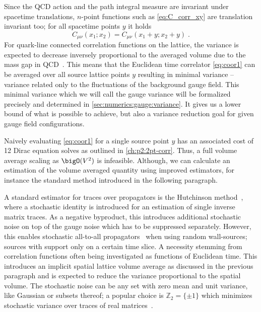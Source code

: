 Since the QCD action and the path integral measure are invariant under spacetime translations, $n$-point functions such as \cref{eq:C_corr_xy} are translation invariant too; for all spacetime points $y$ it holds
\begin{equation} \label{eq:translation:average}
C_{\mu \nu}(x_1; x_2) = C_{\mu \nu}(x_1 + y; x_2 + y) \;.
\end{equation}
For quark-line connected correlation functions on the lattice, the variance is expected to decrease inversely proportional to the averaged volume due to the mass gap in QCD~\cite{Luscher:2017cjh}.
This means that the Euclidean time correlator \cref{eq:coor1} can be averaged over all source lattice points $y$ resulting in minimal variance -- variance related only to the fluctuations of the background gauge field.
This minimal variance which we will call the gauge variance will be formalized precisely and determined in \cref{sec:numerics:gauge:variance}.
It gives us a lower bound of what is possible to achieve, but also a variance reduction goal for given gauge field configurations.

Naively evaluating \cref{eq:coor1} for a single source point $y$ has an associated cost of \num{12} Dirac equation solves as outlined in \cref{ch:p2:2pt-corr}.
Thus, a full volume average scaling as $\bigO(V^{2})$ is infeasible.
Although, we can calculate an estimation of the volume averaged quantity using improved estimators, for instance the standard method introduced in the following paragraph.


A standard estimator for traces  over propagators is the Hutchinson method~\cite{Hutchinson01011990}, where a stochastic identity is introduced for an estimation of single inverse matrix traces.
As a negative byproduct, this introduces additional stochastic noise on top of the gauge noise which has to be suppressed separately.
However, this enables stochastic all-to-all propagators~\cite{Foley:2005ac} when using random wall-sources; sources with support only on a certain time slice.
A necessity stemming from correlation functions often being investigated as functions of Euclidean time.
This introduces an implicit spatial lattice volume average as discussed in the previous paragraph and is expected to reduce the variance proportional to the spatial volume.
The stochastic noise can be any set with zero mean and unit variance, like Gaussian or subsets thereof; a popular choice is $\mathbb{Z}_2 = \{\pm 1\}$ which minimizes stochastic variance over traces of real matrices~\cite{Bernardson:1993he}.

